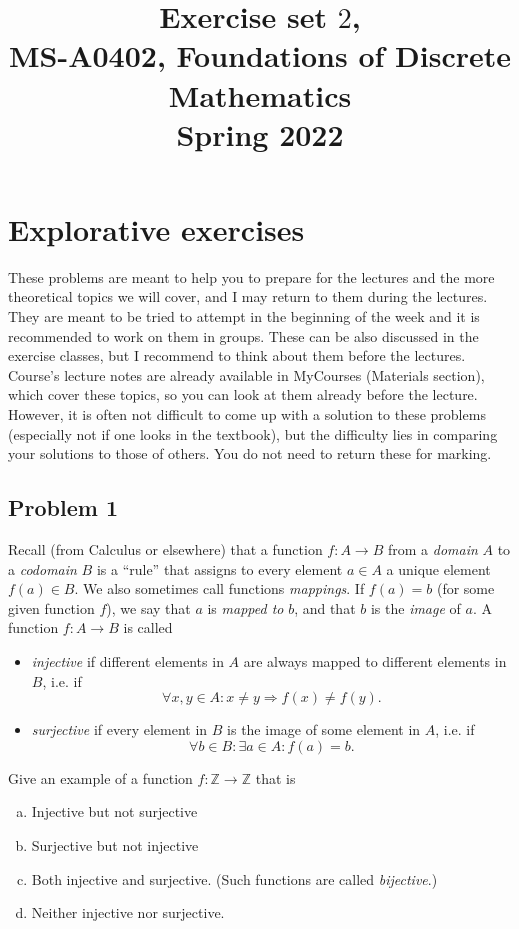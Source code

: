 \documentclass{amsart}
\title{Exercise set $2$, \\ MS-A0402, Foundations of Discrete Mathematics\\Spring 2022}
\newcommand{\Z}{\mathbb{Z}}
\theoremstyle{definition} \newtheorem*{definition}{Definition}
\theoremstyle{remark} \newtheorem*{ex}{Example}
\begin{document}
\hspace{-1cm}
\maketitle
 
\section*{Explorative exercises}
These problems are meant to help you to prepare for the lectures and the more theoretical topics we will cover, and I may return to them during the lectures. They are meant to be tried to attempt in the beginning of the week and it is recommended to work on them in groups. These can be also discussed in the exercise classes, but I recommend to think about them before the lectures. Course's lecture notes are already available in MyCourses (Materials section), which cover these topics, so you can look at them already before the lecture. However, it is often not difficult to come up with a solution to these problems (especially not if one looks in the textbook), but the difficulty lies in comparing your solutions to those of others. You do not need to return these for marking. 

\subsection*{Problem 1}
Recall (from Calculus or elsewhere) that a function $f:A\to B$ from a {\em domain} $A$ to a {\em codomain} $B$ is a ``rule'' that assigns to every element $a\in A$ a unique element $f(a)\in B$. We also sometimes call functions {\em mappings}. If $f(a)=b$ (for some given function $f$), we say that $a$ is {\em mapped to} $b$, and that $b$ is the {\em image} of $a$.
A function $f:A\to B$ is called 
\begin{itemize}
\item  {\em injective} if different elements in $A$ are always mapped to different elements in $B$, i.e. if $$\forall x,y\in A: x\neq y\Rightarrow f(x)\neq f(y).$$ 
\item {\em surjective} if every element in $B$ is the image of some element in $A$, i.e. if $$\forall b\in B:\exists a\in A : f(a)=b.$$
\end{itemize}
 Give an example of a function $f:\Z\to\Z$ that is 
 \begin{enumerate}[a)]
\item Injective but not surjective
\item Surjective but not injective
\item Both injective and surjective. (Such functions are called {\em bijective}.)
\item Neither injective nor surjective.
\end{enumerate}
\end{document}
